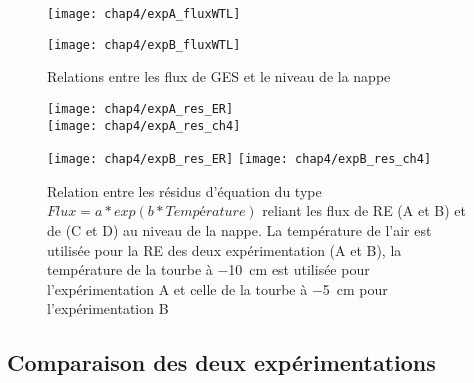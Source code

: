 \begin{figure}
\centering
\begin{minipage}{.5\textwidth}
\centering
\texttt{[image: chap4/expA\_fluxWTL]}
\end{minipage}%
\begin{minipage}{.5\textwidth}
\centering
\texttt{[image: chap4/expB\_fluxWTL]}
\end{minipage}%
\caption{Relations entre les flux de GES et le niveau de la nappe}
\label{fig:hm_wtl}
\end{figure}

\begin{figure}[!tbp]
\centering
\hspace*{-2cm}
\begin{minipage}[]{.55\textwidth}
\texttt{[image: chap4/expA\_res\_ER]}\\
\texttt{[image: chap4/expA\_res\_ch4]}
\end{minipage}
\hspace*{.1cm}
\begin{minipage}[]{.55\textwidth}
\texttt{[image: chap4/expB\_res\_ER]}
\texttt{[image: chap4/expB\_res\_ch4]}
\end{minipage}
\hspace*{-2cm}
\caption{Relation entre les résidus d'équation du type $Flux=a*exp(b*Température) $ reliant les flux de RE (A et B) et de \chh (C et D) au niveau de la nappe. La température de l'air est utilisée pour la RE des deux expérimentation (A et B), la température de la tourbe à \SI{-10}{\centi\metre} est utilisée pour l'expérimentation A et celle de la tourbe à \SI{-5}{\centi\metre} pour l'expérimentation B}
\label{fig:HM_res}
\end{figure}


\subsection{Comparaison des deux expérimentations}

